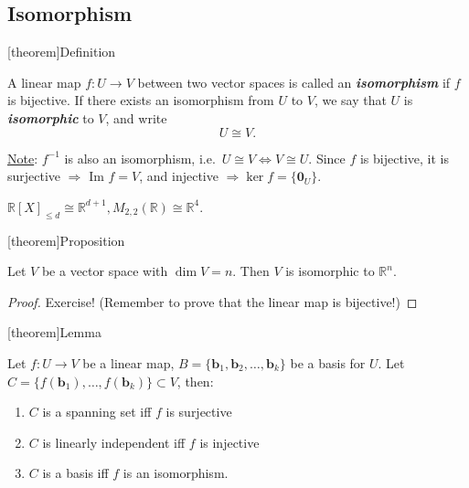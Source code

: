 \documentclass[12pt]{report}
\theoremstyle{definition}
\begin{document}
\subsection{Isomorphism}

[theorem]{Definition}
\begin{isomorphism}
    A linear map $f:U\rightarrow{}V$ between two vector spaces is called an \textbf{\emph{isomorphism}}
    if $f$ is bijective.
    If there exists an isomorphism from $U$ to $V$,
    we say that $U$ is \textbf{\emph{isomorphic}} to $V$, and write\[
        U \cong V.
    \]
\end{isomorphism}

\underline{Note}: $f^{-1}$ is also an isomorphism, i.e.\ $U \cong V \iff V \cong U$.
Since $f$ is bijective, it is surjective $\Rightarrow{}$ Im $f = V$,
and injective $\Rightarrow{} \ker{f} = \{\mathbf{0}_U\}$.

\begin{ex}
    $\mathbb{R}{[X]}_{\le d} \cong \mathbb{R}^{d+1}, M_{2, 2}(\mathbb{R}) \cong \mathbb{R}^{4}$.
\end{ex}

[theorem]{Proposition}
\begin{isomorphic to Rn}
    Let $V$ be a vector space with $\dim{V} = n$.
    Then $V$ is isomorphic to $\mathbb{R}^{n}$.
\end{isomorphic to Rn}

\begin{proof}
    Exercise! (Remember to prove that the linear map is bijective!)
\end{proof}

[theorem]{Lemma}
\begin{C is basis iff f is isomorphism}
    Let $f:U\rightarrow{}V$ be a linear map, $B=\{\mathbf{b}_1, \mathbf{b}_2,\ldots,\mathbf{b}_k\}$
    be a basis for $U$. Let $C = \{f(\mathbf{b}_1),\ldots,f(\mathbf{b}_k)\} \subset V$, then:
    \begin{enumerate}[label = (\roman*)]
        \item $C$ is a spanning set iff $f$ is surjective
        \item $C$ is linearly independent iff $f$ is injective
        \item $C$ is a basis iff $f$ is an isomorphism.
    \end{enumerate}
\end{C is basis iff f is isomorphism}
\end{document}
